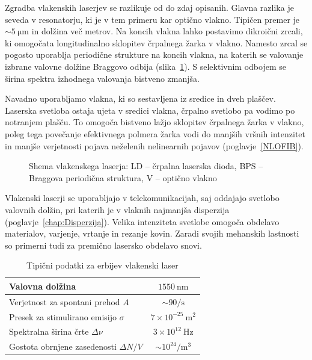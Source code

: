 Zgradba vlakenskih laserjev se razlikuje od do zdaj opisanih. Glavna razlika je
seveda v resonatorju, ki je v tem primeru kar optično vlakno. Tipičen premer je 
$\sim 5~\si{\micro\meter}$ in dolžina več metrov. Na koncih vlakna lahko
postavimo dikroični zrcali, ki omogočata longitudinalno sklopitev črpalnega 
žarka v vlakno. Namesto zrcal se pogosto uporablja periodične strukture 
na koncih vlakna, na katerih se valovanje izbrane valovne dolžine Braggovo odbija
(slika~\ref{fig:Fibshema}). 
S selektivnim odbojem se širina spektra izhodnega valovanja bistveno zmanjša. 

Navadno uporabljamo vlakna, ki so sestavljena iz sredice in dveh plaščev. Laserska
svetloba ostaja ujeta v sredici vlakna, črpalno svetlobo pa vodimo po notranjem plašču. To
omogoča bistveno lažjo sklopitev črpalnega žarka v vlakno, poleg tega povečanje
efektivnega polmera žarka vodi do manjših vršnih intenzitet in manjše verjetnosti
pojava neželenih nelinearnih pojavov (poglavje~\ref{NLOFIB}).

\begin{figure}[h]
\centering
\def\svgwidth{100truemm} 

\caption{Shema vlakenskega laserja: LD -- črpalna laserska dioda, 
BPS -- Braggova periodična struktura, V -- optično vlakno
}
\label{fig:Fibshema}
\end{figure}

Vlakenski laserji se uporabljajo v telekomunikacijah, saj oddajajo svetlobo 
valovnih dolžin, pri katerih je v vlaknih najmanjša disperzija (poglavje~\ref{chap:Disperzija}). 
Velika intenziteta svetlobe omogoča obdelavo materialov, varjenje, vrtanje in rezanje kovin. 
Zaradi svojih mehanskih lastnosti so primerni tudi za premično lasersko obdelavo snovi.

\begin{table}[!h]
\begin{center}
\begin{tabular}{|l|c|}\hline
Valovna dolžina  & $1550~\si{\nano\meter}$\\ \hline
Verjetnost za spontani prehod $A$ & $ \sim 90/\si{\second}$ \\ \hline
Presek za stimulirano emisijo $\sigma$ & $7 \times 10^{-25}~\si{\metre}^2$ \\ \hline
Spektralna širina črte $\Delta \nu$ & $3 \times 10^{12}~\si{\hertz}$  \\ \hline
Gostota obrnjene zasedenosti $\Delta N/V$ & $ \sim 10^{24}/\si{\metre}^3$ \\ \hline
\end{tabular}
\caption{Tipični podatki za erbijev vlakenski laser}
\label{tab:fib}
\end{center}
\end{table}

